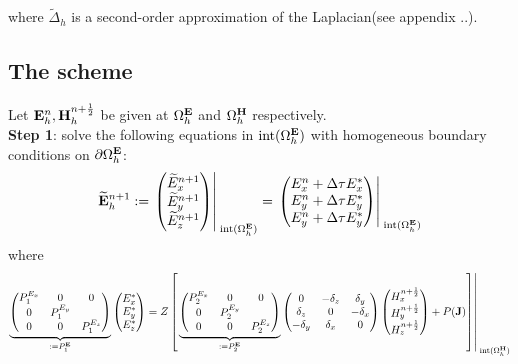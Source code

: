 \documentclass[12pt,reqno]{amsart}
\newcommand{\e}{{\bf E}}
\newcommand{\h}{{\bf H}}
\theoremstyle{definition}
\numberwithin{equation}{section}
\newcommand{\intr}[1]{\mathrm{int}(#1)}
\def\Gwh{\Omega_h}
\begin{document}
where $\tilde{\Delta}_h$ is a second-order approximation of the Laplacian(see appendix ..).
\subsection{The scheme}

	Let $\e^n_h, \h^{n+\frac{1}{2}}_h$  be given at $\Gwh^{\e}$ and $\Gwh^{\h}$ respectively. \\[2mm]
	{\bf Step 1}: solve the following equations in $\intr{\Gwh^{\e}}$ with
	 homogeneous boundary conditions on $\partial \Gwh^\e$: \\[2mm]
	$$
	\widetilde{\e}_h^{n+1}:=
	\left.
	\begin{pmatrix}
		\widetilde{E}_x^{n+1}\\
		\widetilde{E}_y^{n+1}\\
		\widetilde{E}_z^{n+1}
	\end{pmatrix}\right|_{\; \intr{\Gwh^{\e}}}^{\;}=
\left.
	\begin{pmatrix}
		E_x^n+\Delta \tau E_x^{*}\\
		E_y^n+\Delta \tau E_y^{*}\\
		E_y^n+\Delta \tau E_y^{*}
	\end{pmatrix}\right|_{\; \intr{\Gwh^{\e}}}^{\;}
	$$
	where 
	$$
	\underbrace{
	\begin{pmatrix}
		P_1^{E_x} & 0&0 \\
		0 & P_1^{E_y} &\\
		0&0&P_1^{E_z} 
	\end{pmatrix}
}_{:=P_1^\e}
	\begin{pmatrix}
		E_x^{*}\\
		E_y^{*} \\
		E_z^{*}
	\end{pmatrix}=Z
\left [ \left.
	\underbrace{
	\begin{pmatrix}
		P_2^{E_x} & 0&0 \\
		0 & P_2^{E_y} &\\
		0&0&P_2^{E_z} 
	\end{pmatrix}
}_{:=P_2^\e}
	\begin{pmatrix}
		0& -\delta_z & \delta _y\\
		\delta_z&0&-\delta_x\\
		-\delta_y&\delta_x&0
	\end{pmatrix}
	\begin{pmatrix}
		H_x^{n+\frac{1}{2}}\\
		H_y^{n+\frac{1}{2}}\\
		H_z^{n+\frac{1}{2}}
	\end{pmatrix}+P({\bf J})\right]\right|_{\; \intr{\Gwh^{\h}}}^{\;}
	$$
\end{document}
